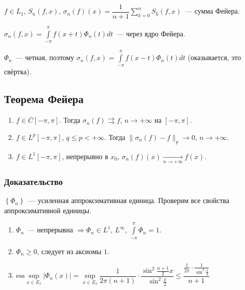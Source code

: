 \documentclass{article}
\begin{document}
    $f \in L_1$, $S_n(f, x)$, $\sigma_n(f)(x) = \dfrac{1}{n + 1} \sum\limits_{k = 0}^n S_k(f, x)$~--- сумма Фейера.
    
    $\sigma_n(f, x) = \int\limits^{\pi}_{-\pi} f(x + t) \Phi_n(t) dt$~--- через ядро Фейера.
    
    $\Phi_n$~--- четная, поэтому $\sigma_n(f, x) = \int\limits^{\pi}_{-\pi} f(x - t) \Phi_n(t) dt$ (оказывается, это свёртка).
    
        \subsection{Теорема Фейера}
        
            \begin{enumerate}
            
                \item $f \in \overline{C}[-\pi, \pi]$. Тогда $\sigma_n(f) \rightrightarrows f$, $n \rightarrow +\infty$ на $[-\pi, \pi]$.
                
                \item $f \in L^p [-\pi, \pi]$, $q \leqslant p < +\infty$. Тогда $\| \sigma_n(f) - f \|_p \rightarrow 0$, $n \rightarrow +\infty$.
                
                \item $f \in L^1 [-\pi, \pi]$, непрерывно в $x_0$, $\sigma_n(f)(x) \xrightarrow[n \rightarrow +\infty]{} f(x)$.
                
            \end{enumerate}
            
            \subsubsection{Доказательство}
            
                $\left\{ \Phi_n \right\}$~--- усиленная аппроксимативная единица. Проверим все свойства аппроксимативной единицы.
                
                \begin{enumerate}
                
                    \item $\Phi_n$~--- непрерывна $\Rightarrow \Phi_n \in L^1$, $L^{\infty}$, $\int\limits^{\pi}_{-\pi} \Phi_n = 1$.
                    
                    \item $\Phi_n \geqslant 0$, следует из аксиомы $1$.
                    
                    \item $\mathrm{ess}\sup\limits_{x \in E_{\delta}} \left| \Phi_n(x) \right| = \sup\limits_{x \in E_{\delta}} \dfrac{1}{2 \pi (n + 1)} \cdot \dfrac{\sin^2 {\frac{n + 1}{2}} x}{\sin^2 \frac{x}{2}} \leqslant \dfrac{\frac{1}{2 \pi} \cdot \frac{1}{\sin^2 \frac{\delta}{2}}}{n + 1}$
                    
                \end{enumerate}
                
\end{document}
